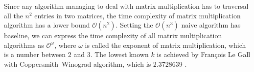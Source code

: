 \documentclass[catalog.tex]{subfiles}
\begin{document}
Since any algorithm managing to deal with matrix multiplication has to traversal all the $n^2$ entries in two matrices, the time complexity of matrix multiplication algorithm has a lower bound $\mathcal{O}(n^2)$. Setting the $\mathcal{O}(n^3)$ naive algorithm has baseline, we can express the time complexity of all matrix multiplication algorithms as $\mathcal{O^\omega}$, where $\omega$ is called the exponent of matrix multiplication, which is a number between 2 and 3. The lowest known $k$ is achieved by François Le Gall with Coppersmith–Winograd algorithm, which is 2.3728639 \cite{le2014powers}.

\singlespacing
\printbibliography[title={References.},resetnumbers=true,heading=subbibliography]
\end{document}
